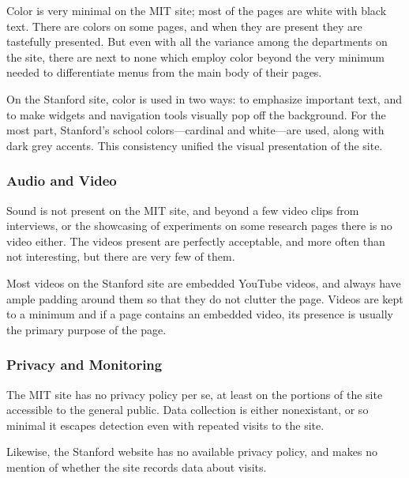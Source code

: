 Color is very minimal on the MIT site; most of the pages are white with black text. There
are colors on some pages, and when they are present they are tastefully presented. But
even with all the variance among the departments on the site, there are next to none
which employ color beyond the very minimum needed to differentiate menus from the main
body of their pages.

On the Stanford site, color is used in two ways: to emphasize important text,
and to make widgets and navigation tools visually pop off the background.
For the most part, Stanford's school colors---cardinal and white---are used,
along with dark grey accents. This consistency unified the visual presentation
of the site.

\subsubsection*{Audio and Video}

Sound is not present on the MIT site, and beyond a few video clips from interviews, or the
showcasing of experiments on some research pages there is no video either. The videos
present are perfectly acceptable, and more often than not interesting, but there are very
few of them.

Most videos on the Stanford site are embedded YouTube videos, and always have ample
padding around them so that they do not clutter the page. Videos are kept to a
minimum and if a page contains an embedded video, its presence is usually the
primary purpose of the page.

\subsubsection*{Privacy and Monitoring}

The MIT site has no privacy policy per se, at least on the portions of the site accessible to the
general public. Data collection is either nonexistant, or so
minimal it escapes detection even with repeated visits to the site.

Likewise, the Stanford website has no available privacy policy, and makes no mention
of whether the site records data about visits.
